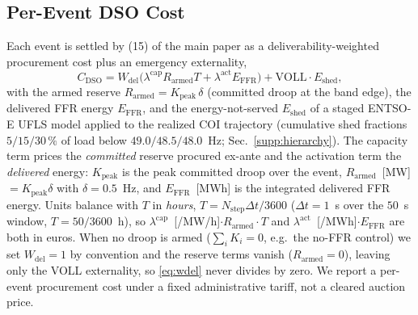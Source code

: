 \documentclass[lettersize,journal]{IEEEtran}
\begin{document}
\subsection{Per-Event DSO Cost}
\label{supp:dsocost}
Each event is settled by (15) of the main paper as a deliverability-weighted procurement cost plus an emergency externality,
\begin{equation}
  C_{\mathrm{DSO}}
   = W_{\mathrm{del}}\big(\lambda^{\mathrm{cap}}R_{\mathrm{armed}}T
     + \lambda^{\mathrm{act}}E_{\mathrm{FFR}}\big)
   + \mathrm{VOLL}\cdot E_{\mathrm{shed}},
  \label{eq:dsocost}
\end{equation}
with the armed reserve $R_{\mathrm{armed}}=K_{\mathrm{peak}}\,\delta$ (committed droop at the band edge), the delivered FFR energy $E_{\mathrm{FFR}}$, and the energy-not-served $E_{\mathrm{shed}}$ of a staged ENTSO-E UFLS model applied to the realized COI trajectory (cumulative shed fractions $5/15/30\,\%$ of load below $49.0/48.5/48.0$~Hz; Sec.~\ref{supp:hierarchy}). The capacity term prices the \emph{committed} reserve procured ex-ante and the activation term the \emph{delivered} energy: $K_{\mathrm{peak}}$ is the peak committed droop over the event, $R_{\mathrm{armed}}$~[MW]$=K_{\mathrm{peak}}\delta$ with $\delta=0.5$~Hz, and $E_{\mathrm{FFR}}$~[MWh] is the integrated delivered FFR energy. Units balance with $T$ in \emph{hours}, $T=N_{\mathrm{step}}\Delta t/3600$ ($\Delta t=1$~s over the $50$~s window, $T=50/3600$~h), so $\lambda^{\mathrm{cap}}$~[\texteuro/MW/h]$\cdot R_{\mathrm{armed}}\cdot T$ and $\lambda^{\mathrm{act}}$~[\texteuro/MWh]$\cdot E_{\mathrm{FFR}}$ are both in euros. When no droop is armed ($\sum_i K_i=0$, e.g.\ the no-FFR control) we set $W_{\mathrm{del}}=1$ by convention and the reserve terms vanish ($R_{\mathrm{armed}}=0$), leaving only the VOLL externality, so \eqref{eq:wdel} never divides by zero. We report a per-event procurement cost under a fixed administrative tariff, not a cleared auction price.
\end{document}
